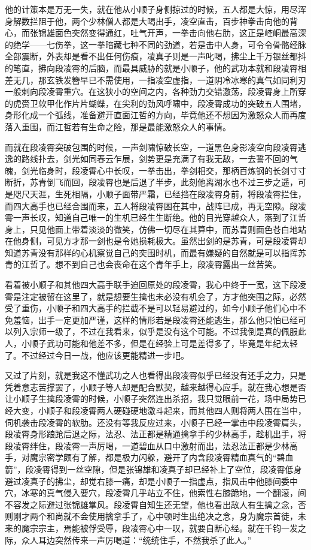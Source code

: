 他的计策本是万无一失，就在他从小顺子身侧掠过的时候，五人都是大惊，用尽浑身解数拦阻于他，两个少林僧人都是大喝出手，凌空直击，百步神拳击向他的背心，而张锦雄面色突然变得通红，吐气开声，一拳击向他右肋，这正是崆峒最高深的绝学——七伤拳，这一拳暗藏七种不同的劲道，若是击中人身，可令令骨骼经脉全部震断，外表却是看不出任何伤痕，凌真子则是一声叱喝，拂尘上千万银丝都抖的笔直，拂向段凌霄的后脑，而最具威胁的就是小顺子，他的武功本就和段凌霄相差无几，那玄铁发簪早已不需使用，一指凌空虚指，一道阴冷冰寒的真气如同利刃一般刺向段凌霄重穴。在这狭小的空间之内，各种劲力交错激荡，段凌霄身上所穿的虎赍卫软甲化作片片蝴蝶，在尖利的劲风呼啸中，段凌霄成功的突破五人围堵，身形化成一个弧线，准备避开直面江哲的方向，毕竟他还不想因为激怒众人而再度落入重围，而江哲若有生命之险，那是最能激怒众人的事情。

而就在段凌霄突破包围的时候，一声剑啸惊破长空，一道黑色身影凌空向段凌霄逃逸的路线扑去，剑光如同春云乍展，剑势更是充满了有我无敌，一去誓不回的气魄，剑光临身时，段凌霄心中长叹，一拳击出，拳剑相交，那柄百炼钢的长剑寸寸断折，苏青倒飞而回，段凌霄也是后退了半步，此刻他离湖水也不过三步之遥，可是咫尺天涯，生死相隔，小顺子面带严霜，已经挡在段凌霄身前，将段凌霄拦住，而四大高手也已经合围而来，五人将段凌霄困在其中，战阵已成，再无空隙。段凌霄一声长叹，知道自己唯一的生机已经生生断绝。他的目光穿越众人，落到了江哲身上，只见他面上带着淡淡的微笑，仿佛一切尽在其算中，而苏青则面色苍白地站在他身侧，可见方才那一剑也是令她损耗极大。虽然出剑的是苏青，可是段凌霄却知道苏青没有那样的心机察觉自己的突围时机，而最有嫌疑的自然就是可以指挥苏青的江哲了。想不到自己也会丧命在这个青年手上，段凌霄露出一丝苦笑。

看着被小顺子和其他四大高手联手迫回原处的段凌霄，我心中终于一宽，这下段凌霄是注定被留在这里了，就是想要生擒也未必没有机会了，方才他突围之际，必然受了重伤，小顺子和四大高手的拦截不是可以轻易避过的，如今小顺子他们心中不免羞恼，出手一定更加严谨，这样的情形若是段凌霄还能逃生，那么他只怕已经可以列入宗师一级了，不过在我看来，似乎是没有这个可能。不过我倒是真的佩服此人，小顺子武功可能和他差不多，但是在经验上可是差得多了，毕竟是年纪太轻了。不过经过今日一战，他应该更能精进一步吧。

又过了片刻，就是我这不懂武功之人也看得出段凌霄似乎已经没有还手之力，只是凭着意志苦撑罢了，小顺子等人却是配合默契，越来越得心应手。就在我心想是否让小顺子生擒段凌霄的时候，小顺子突然连出杀招，我只觉眼前一花，场中局势已经大变，小顺子和段凌霄两人硬碰硬地激斗起来，而其他四人则将两人围在当中，伺机袭击段凌霄的软肋。还没有等我反应过来，小顺子已经一掌击中段凌霄肩头，段凌霄身形踉跄后退之际，法忍、法正都是精通擒拿手的少林高手，趁机出手，将段凌霄绊住，段凌霄一声厉喝，一道碧血从口中激射而出，法忍法正都是少林高手，对魔宗密学颇有了解，都是极力闪躲，避开了内含段凌霄精血真气的“碧血箭”，段凌霄得到一丝空隙，但是张锦雄和凌真子却已经补上了空位，段凌霄低身避过凌真子的拂尘，却觉右膝一痛，却是小顺子一指虚点，指风击中他膝间委中穴，冰寒的真气侵入要穴，段凌霄几乎站立不住，他索性右膝跪地，一个翻滚，间不容发之际避过张锦雄掌风。段凌霄自知生还无望，他也看出敌人有生擒之念，否则刚才两个和尚就不会使用擒拿手了，心中顿时生出绝决之念，身为魔宗首徒，未来的魔宗宗主，焉能被俘受辱，段凌霄心中一叹，就要自断心经。就在千钧一发之际，众人耳边突然传来一声厉喝道：“统统住手，不然我杀了此人。”


